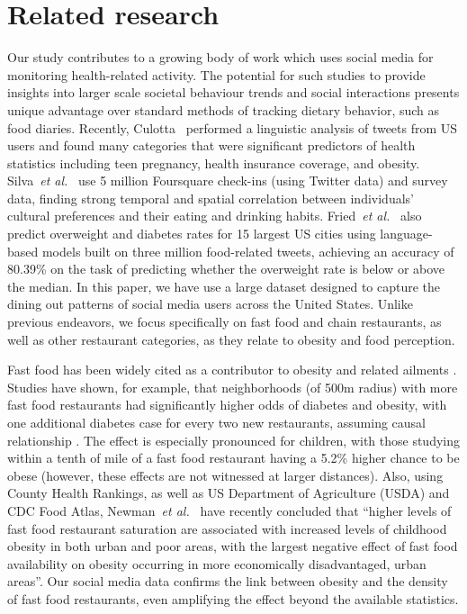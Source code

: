 \documentclass{sig-alternate-2013}
\def\etal{{\it et al.}}
\begin{document}
\section{Related research}
\label{sec:related}



Our study contributes to a growing body of work which uses social media for monitoring health-related activity. The potential for such studies to provide insights into larger scale societal behaviour trends and social interactions presents unique advantage over standard methods of tracking dietary behavior, such as food diaries. 
Recently, Culotta~\cite{Culotta:2014:ECH:2556288.2557139} performed a linguistic analysis of tweets from US users and found many categories that were significant predictors of health statistics including teen pregnancy, health insurance coverage, and obesity. 
Silva~\etal~\cite{Silva14:youare} use 5 million Foursquare check-ins (using Twitter data) and survey data, finding strong temporal and spatial correlation between individuals' cultural preferences and their eating and drinking habits. 
Fried~\etal~\cite{DBLP:journals/corr/FriedSKHB14} also predict overweight and diabetes rates for 15 largest US cities using language-based models built on three million food-related tweets, achieving an accuracy of 80.39\% on the task of predicting whether the overweight rate is below or above the median. In this paper, we have use a large dataset designed to capture the dining out patterns of social media users across the United States. Unlike previous endeavors, we focus specifically on fast food and chain restaurants, as well as other restaurant categories, as they relate to obesity and food perception. 





Fast food has been widely cited as a contributor to obesity and related ailments \cite{schlosser2012fast}. Studies have shown, for example, that neighborhoods (of 500m radius) with more fast food restaurants had significantly higher odds of diabetes and obesity, with one additional diabetes case for every two new restaurants, assuming causal relationship \cite{bodicoat2014number}. The effect is especially pronounced for children, with those studying within a tenth of mile of a fast food restaurant having a 5.2\% higher chance to be obese \cite{currie2009effect} (however, these effects are not witnessed at larger distances). Also, using County Health Rankings, as well as US Department of Agriculture (USDA) and CDC Food Atlas, Newman~\etal~\cite{newman2014implications} have recently concluded that ``higher levels of fast food restaurant saturation are associated with increased levels of childhood obesity in both urban and poor areas, with the largest negative effect of fast food availability on obesity occurring in more economically disadvantaged, urban areas''. Our social media data confirms the link between obesity and the density of fast food restaurants, even amplifying the effect beyond the available statistics.
\end{document}
